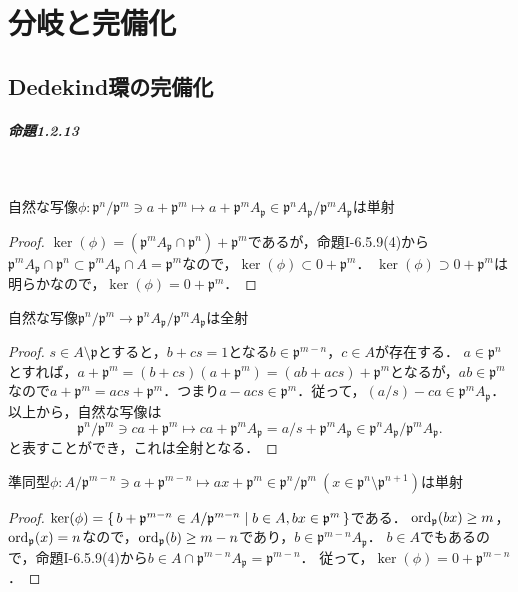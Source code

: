 \chapter{分岐と完備化}
\setcounter{section}{1}
\section{Dedekind環の完備化}
\paragraph{命題1.2.13}~
\begin{screen}
  自然な写像$\phi\colon\mathfrak{p}^n/\mathfrak{p}^m \ni a + \mathfrak{p}^m \mapsto a + \mathfrak{p}^mA_\mathfrak{p} \in \mathfrak{p}^nA_\mathfrak{p}/\mathfrak{p}^mA_\mathfrak{p}$は単射
\end{screen}
\begin{proof}
  $\ker(\phi) = (\mathfrak{p}^mA_\mathfrak{p}\cap\mathfrak{p}^n) + \mathfrak{p}^m$であるが，命題I-6.5.9(4)から$\mathfrak{p}^mA_\mathfrak{p}\cap\mathfrak{p}^n\subset\mathfrak{p}^mA_\mathfrak{p}\cap A = \mathfrak{p}^m$なので，$\ker(\phi)\subset 0 + \mathfrak{p}^m$．
  $\ker(\phi)\supset 0 + \mathfrak{p}^m$は明らかなので，$\ker(\phi) = 0 + \mathfrak{p}^m$．
\end{proof}

\begin{screen}
  自然な写像$\mathfrak{p}^n/\mathfrak{p}^m\to\mathfrak{p}^nA_\mathfrak{p}/\mathfrak{p}^mA_\mathfrak{p}$は全射
\end{screen}
\begin{proof}
  $s\in A\setminus\mathfrak{p}$とすると，$b + cs = 1$となる$b\in\mathfrak{p}^{m-n}$，$c\in A$が存在する．
  $a\in\mathfrak{p}^n$とすれば，$a + \mathfrak{p}^m = (b + cs)(a + \mathfrak{p}^m) = (ab + acs) + \mathfrak{p}^m$となるが，$ab\in\mathfrak{p}^m$なので$a + \mathfrak{p}^m = acs + \mathfrak{p}^m$．つまり$a-acs\in\mathfrak{p}^m$．従って，$(a/s)-ca\in\mathfrak{p}^mA_\mathfrak{p}$．以上から，自然な写像は
  \[\mathfrak{p}^n/\mathfrak{p}^m\ni ca + \mathfrak{p}^m\mapsto ca + \mathfrak{p}^mA_\mathfrak{p} = a/s + \mathfrak{p}^mA_\mathfrak{p}\in\mathfrak{p}^nA_\mathfrak{p}/\mathfrak{p}^mA_\mathfrak{p}.\]
  と表すことができ，これは全射となる．
\end{proof}

\begin{screen}
  準同型$\phi \colon A/\mathfrak{p}^{m-n} \ni a + \mathfrak{p}^{m-n} \mapsto ax + \mathfrak{p}^{m} \in \mathfrak{p}^{n}/\mathfrak{p}^{m} ~ (x \in \mathfrak{p}^n \setminus \mathfrak{p}^{n + 1})$は単射
\end{screen}
\begin{proof}
  $\ker(\phi) = \set{b + \mathfrak{p}^{m-n}\in A/\mathfrak{p}^{m-n} | b\in A, bx\in\mathfrak{p}^m}$である．
  $\operatorname{ord}_\mathfrak{p}(bx)\geq m$，$\operatorname{ord}_\mathfrak{p}(x) = n$なので，$\operatorname{ord}_\mathfrak{p}(b)\geq m-n$であり，$b\in\mathfrak{p}^{m-n}A_\mathfrak{p}$．
  $b\in A$でもあるので，命題I-6.5.9(4)から$b\in A\cap\mathfrak{p}^{m-n}A_\mathfrak{p} = \mathfrak{p}^{m-n}$．
  従って，$\ker(\phi) = 0 + \mathfrak{p}^{m-n}$．
\end{proof}

